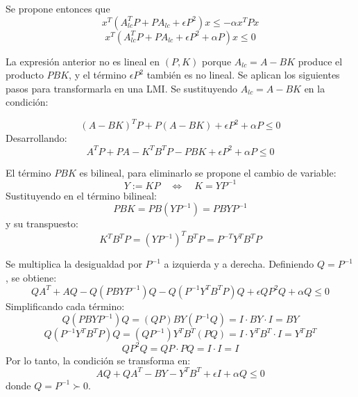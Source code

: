 \begin{itemize}
Se propone entonces que
\begin{equation*}
x^{T}\left(A_{lc}^{T}P + PA_{lc} + \epsilon P^{2}\right)x \leq -\alpha x^{T}Px
\end{equation*}
\begin{equation*}
   x^T \left(A_{lc}^TP+PA_{lc}+\epsilon P^2 +\alpha P\right) x \leq 0
\end{equation*}

La expresión anterior no es lineal en \((P,K)\) porque \(A_{lc}=A-BK\) produce el producto \(PBK\), y el término \(\epsilon P^2\) también es no lineal. Se aplican los siguientes pasos para transformarla en una LMI. Se sustituyendo \(A_{lc} = A - BK\) en la condición:

\begin{equation*}
    (A - BK)^T P + P(A - BK) + \epsilon P^2 + \alpha P \leq 0
\end{equation*}
Desarrollando:
\begin{equation*}
    A^T P + P A - K^T B^T P - P B K + \epsilon P^2 + \alpha P \leq 0
\end{equation*}

El término \(P B K\) es bilineal, para eliminarlo se propone el cambio de variable:
\begin{equation*}
    Y := K P \quad \Longleftrightarrow \quad K = Y P^{-1}
\end{equation*}
Sustituyendo en el término bilineal:
\begin{equation*}
    P B K = P B (Y P^{-1}) = P B Y P^{-1}
\end{equation*}
y su transpuesto:
\begin{equation*}
    K^T B^T P = (Y P^{-1})^T B^T P = P^{-T} Y^T B^T P
\end{equation*}

Se multiplica la desigualdad por \(P^{-1}\) a izquierda y a derecha. Definiendo \(Q = P^{-1}\), se obtiene:
\begin{equation*}
    Q A^T + A Q - Q (P B Y P^{-1}) Q - Q (P^{-1} Y^T B^T P) Q + \epsilon Q P^2 Q + \alpha Q \leq 0
\end{equation*}
Simplificando cada término:
\begin{equation*}
    Q (P B Y P^{-1}) Q = (Q P) B Y (P^{-1} Q) = I \cdot B Y \cdot I = B Y
\end{equation*}
\begin{equation*}
    Q (P^{-1} Y^T B^T P) Q = (Q P^{-1}) Y^T B^T (P Q) = I \cdot Y^T B^T \cdot I = Y^T B^T
\end{equation*}
\begin{equation*}
    Q P^2 Q = Q P \cdot P Q = I \cdot I = I
\end{equation*}
Por lo tanto, la condición se transforma en:
\begin{equation*}
    A Q + Q A^T - B Y - Y^T B^T + \epsilon I + \alpha Q \leq 0
\end{equation*}
donde \(Q = P^{-1} \succ 0\). 


\end{itemize}
